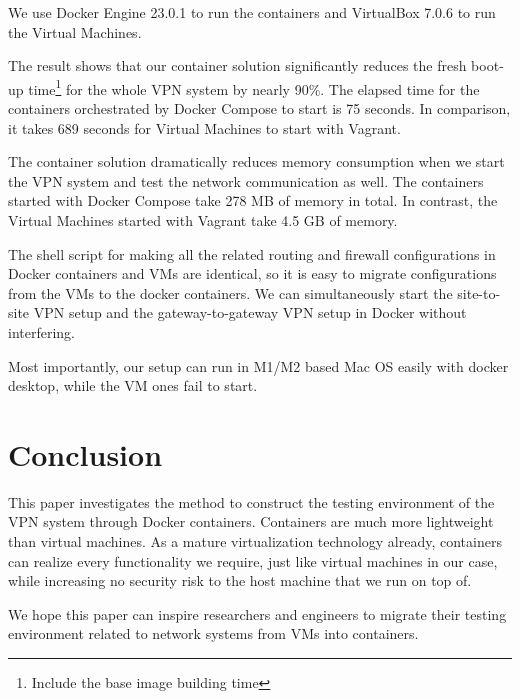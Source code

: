 \documentclass[article]{aaltoseries}
\begin{document}
We use Docker Engine 23.0.1 to run the containers and VirtualBox 7.0.6 to run the Virtual Machines.

The result shows that our container solution significantly reduces the fresh boot-up time\footnote{Include the base image building time} for the whole VPN system by nearly 90\%. The elapsed time for the containers orchestrated by Docker Compose to start is 75 seconds. In comparison, it takes 689 seconds for Virtual Machines to start with Vagrant.

The container solution dramatically reduces memory consumption when we start the VPN system and test the network communication as well. The containers started with Docker Compose take 278 MB of memory in total. In contrast, the Virtual Machines started with Vagrant take 4.5 GB of memory.

The shell script for making all the related routing and firewall configurations in Docker containers and VMs are identical, so it is easy to migrate configurations from the VMs to the docker containers. We can simultaneously start the site-to-site VPN setup and the gateway-to-gateway VPN setup in Docker without interfering.

Most importantly, our setup can run in M1/M2 based Mac OS easily with docker desktop, while the VM ones fail to start.



\section{Conclusion}

This paper investigates the method to construct the testing environment of the VPN system through Docker containers. Containers are much more lightweight than virtual machines. As a mature virtualization technology already, containers can realize every functionality we require, just like virtual machines in our case, while increasing no security risk to the host machine that we run on top of.

We hope this paper can inspire researchers and engineers to migrate their testing environment related to network systems from VMs into containers.



\end{document}
